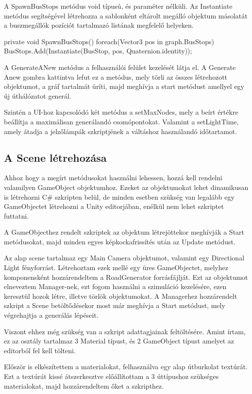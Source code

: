 A SpawnBusStops metódus void típusú, és paraméter nélküli. Az Instantiate metódus segítségével létrehozza a sablonként eltárolt megálló objektum másolatát a buszmegállók pozíciót tartalmazó listának megfelelő helyeken.
\begin{cpp}
private void SpawnBusStops()
    {
        foreach(Vector3 pos in graph.BusStops)
        {
            BusStops.Add(Instantiate(BusStop, pos, Quaternion.identity));
        }
    }
\end{cpp}
A GenerateANew metódus a felhasználói felület kezelését látja el. A Generate Anew gombra kattintva lefut ez a metódus, mely törli az összes létrehozott objektumot, a gráf tartalmát üríti, majd meghívja a start metódust amellyel egy új úthálózatot generál.

Szintén a UI-hoz kapcsolódó két metódus a setMaxNodes, mely a beírt értékre beállítja a maximálisan generálandó csomópontokat. Valamint a setLightTime, amely átadja a jelzőlámpák szkriptjének a váltáshoz használandó időtartamot.
\subsection{A Scene létrehozása}
Ahhoz hogy a megírt metódusokat használni lehessen, hozzá kell rendelni valamilyen GameObject objektumhoz. Ezeket az objektumokat lehet dinamikusan is létrehozni C\# szkripten belül, de minden esetben szükség van legalább egy GameObjectet létrehozni a Unity editorjában, enélkül nem lehet szkriptet futtatni.

A GameObjecthez rendelt szkriptek az objektum létrejöttekor meghívják a Start metódusokat, majd minden egyes képkockafrissítés után az Update metódust.

Az alap scene tartalmaz egy Main Camera objektumot, valamint egy Directional Light fényforrást. Létrehoztam ezek mellé egy üres GameObjectet, melyhez komponensként hozzárendeltem a RoadGenerator forrásfájlját. Ezt az objektumot elneveztem Manager-nek, ezt fogom használni a szimuláció kezelésére, ezen keresztül hozok létre, illetve törlök objektumokat. A Managerhez hozzárendelt szkript a Scene betöltődésekor most már meghívja a Start metódust, mely végrehajtja a generálás lépéseit.

Viszont ehhez még szükség van a szkript adattagjainak feltöltésére. Amint írtam, ez az osztály tartalmaz 3 Material típust, és 2 GameObject típust amelyet az editorból fel kell tölteni. 

Először is elkészítettem a materialokat, felhasználva egy alap útburkolat textúrát. Ezt a textúrát kissé átszerkesztve előállítottam a 3 úttípushoz szükséges materialokat, majd hozzárendeltem őket a szkripthez.

